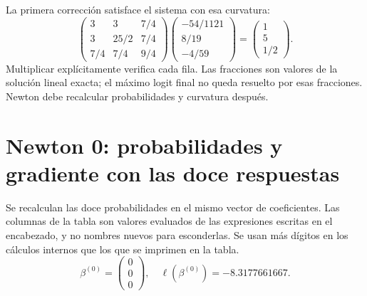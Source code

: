 \documentclass[11pt,a4paper]{article}
\begin{document}
La primera corrección satisface el sistema con esa curvatura:
\[
\begin{pmatrix}3&3&7/4\\3&25/2&7/4\\7/4&7/4&9/4\end{pmatrix}
\begin{pmatrix}-54/1121\\8/19\\-4/59\end{pmatrix}
=\begin{pmatrix}1\\5\\1/2\end{pmatrix}.
\]
Multiplicar explícitamente verifica cada fila.
Las fracciones son valores de la solución lineal exacta;
el máximo logit final no queda resuelto por esas fracciones.
Newton debe recalcular probabilidades y curvatura después.

\clearpage
\section{Newton 0: probabilidades y gradiente con las doce respuestas}\label{logit96}
Se recalculan las doce probabilidades en el mismo vector
de coeficientes. Las columnas de la tabla son valores evaluados
de las expresiones escritas en el encabezado, y no nombres nuevos
para esconderlas. Se usan más dígitos en los cálculos internos
que los que se imprimen en la tabla.
\[
\beta^{(0)}=\begin{pmatrix}0\\0\\0\end{pmatrix},\quad \ell(\beta^{(0)})=-8.3177661667.
\]
\end{document}
